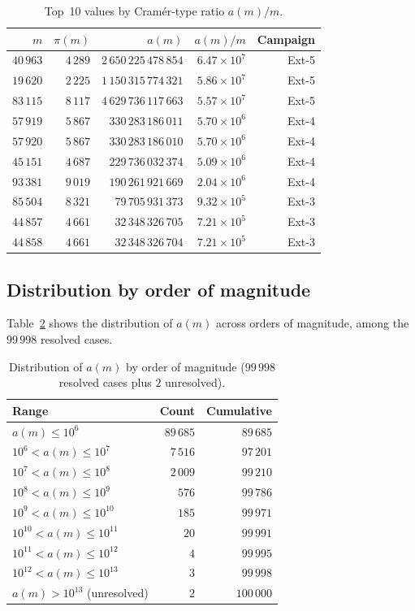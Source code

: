 \documentclass[11pt]{article}
\theoremstyle{definition}
\theoremstyle{remark}
\numberwithin{equation}{section}
\begin{document}
\begin{table}[ht]
\centering
\caption{Top~10 values by Cram\'er-type ratio $a(m)/m$.}
\label{tab:top10_ratio}
\small
\begin{tabular}{rrrrr}
\toprule
$m$ & $\pi(m)$ & $a(m)$ & $a(m)/m$ & Campaign \\
\midrule
$40\,963$ & $4\,289$ & $2\,650\,225\,478\,854$ & $6.47 \times 10^7$ & Ext-5 \\
$19\,620$ & $2\,225$ & $1\,150\,315\,774\,321$ & $5.86 \times 10^7$ & Ext-5 \\
$83\,115$ & $8\,117$ & $4\,629\,736\,117\,663$ & $5.57 \times 10^7$ & Ext-5 \\
$57\,919$ & $5\,867$ & $330\,283\,186\,011$ & $5.70 \times 10^6$ & Ext-4 \\
$57\,920$ & $5\,867$ & $330\,283\,186\,010$ & $5.70 \times 10^6$ & Ext-4 \\
$45\,151$ & $4\,687$ & $229\,736\,032\,374$ & $5.09 \times 10^6$ & Ext-4 \\
$93\,381$ & $9\,019$ & $190\,261\,921\,669$ & $2.04 \times 10^6$ & Ext-4 \\
$85\,504$ & $8\,321$ & $79\,705\,931\,373$ & $9.32 \times 10^5$ & Ext-3 \\
$44\,857$ & $4\,661$ & $32\,348\,326\,705$ & $7.21 \times 10^5$ & Ext-3 \\
$44\,858$ & $4\,661$ & $32\,348\,326\,704$ & $7.21 \times 10^5$ & Ext-3 \\
\bottomrule
\end{tabular}
\end{table}

\subsection{Distribution by order of magnitude}

Table~\ref{tab:distribution} shows the distribution of $a(m)$
across orders of magnitude, among the $99\,998$ resolved cases.

\begin{table}[ht]
\centering
\caption{Distribution of $a(m)$ by order of magnitude
($99\,998$ resolved cases plus $2$ unresolved).}
\label{tab:distribution}
\begin{tabular}{lrr}
\toprule
Range & Count & Cumulative \\
\midrule
$a(m) \le 10^6$     & $89\,685$ & $89\,685$ \\
$10^6 < a(m) \le 10^7$   & $7\,516$ & $97\,201$ \\
$10^7 < a(m) \le 10^8$   & $2\,009$ & $99\,210$ \\
$10^8 < a(m) \le 10^9$   & $576$ & $99\,786$ \\
$10^9 < a(m) \le 10^{10}$  & $185$ & $99\,971$ \\
$10^{10} < a(m) \le 10^{11}$ & $20$ & $99\,991$ \\
$10^{11} < a(m) \le 10^{12}$ & $4$ & $99\,995$ \\
$10^{12} < a(m) \le 10^{13}$ & $3$ & $99\,998$ \\
$a(m) > 10^{13}$ (unresolved) & $2$ & $100\,000$ \\
\bottomrule
\end{tabular}
\end{table}
\end{document}
